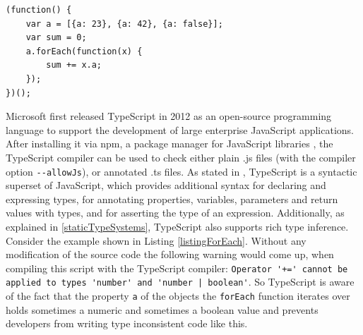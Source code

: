 \documentclass[runningheads,a4paper]{llncs}
\begin{document}
\medskip\medskip
\lstset{language=javascript}
\begin{minipage}{\linewidth}
\begin{lstlisting}[frame=single, caption=Inconsistent ForEach, label=listingForEach]
(function() {
    var a = [{a: 23}, {a: 42}, {a: false}];
    var sum = 0;
    a.forEach(function(x) {
        sum += x.a;
    });
})();
\end{lstlisting}
\end{minipage}
Microsoft first released TypeScript in 2012 as an open-source programming language to support the development of large enterprise JavaScript applications. 
After installing it via npm, a package manager for JavaScript libraries \cite{npm}, the TypeScript compiler can be used to check either plain .js files (with the compiler option  \lstinline[columns=fixed]{--allowJs}), or annotated .ts files.
As stated in \cite{DBLP:conf/ecoop/BiermanAT14}, TypeScript is a syntactic superset of JavaScript, which provides additional syntax for declaring and expressing types, for annotating properties, variables, parameters and return values with types, and for asserting the type of an expression.
Additionally, as explained in \ref{staticTypeSystems}, TypeScript also supports rich type inference.
Consider the example shown in Listing \ref{listingForEach}.
Without any modification of the source code the following warning would come up, when compiling this script with the TypeScript compiler:
\lstinline[columns=fixed]{Operator '+=' cannot be applied to types 'number' and 'number | boolean'}.
So TypeScript is aware of the fact that the property \lstinline[columns=fixed]{a} of the objects the \lstinline[columns=fixed]{forEach} function iterates over holds sometimes a numeric and sometimes a boolean value and prevents developers from writing type inconsistent code like this.
\end{document}
